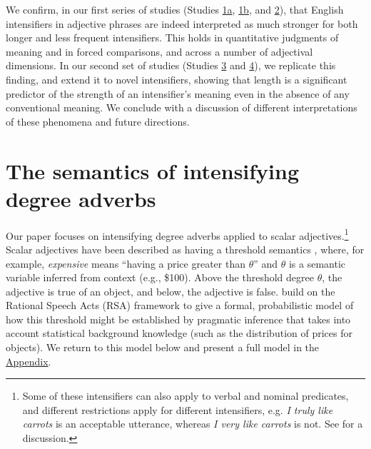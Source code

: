 \documentclass[10pt,letterpaper]{article}
\newcommand{\w}[1]{\emph{#1}}
\begin{document}
We confirm, in our first series of studies (Studies \hyperref[sec:study1a]{1a}, \hyperref[sec:study1b]{1b}, and \hyperref[sec:study2]{2}), that English intensifiers in adjective phrases are indeed interpreted as much stronger for both longer and less frequent intensifiers.
This holds in quantitative judgments of meaning and in forced comparisons, and across a number of adjectival dimensions.
In our second set of studies (Studies \hyperref[sec:study3]{3} and \hyperref[sec:study4]{4}), we replicate this finding, and extend it to novel intensifiers, showing that length is a significant predictor of the strength of an intensifier’s meaning even in the absence of any conventional meaning.
We conclude with a discussion of different interpretations of these phenomena and future directions.

\section{The semantics of intensifying degree adverbs \label{sec:semantics}}

Our paper focuses on intensifying degree adverbs applied to scalar adjectives.\footnote{
  Some of these intensifiers can also apply to verbal and nominal predicates, and different restrictions apply for different intensifiers, e.g. \w{I truly like carrots} is an acceptable utterance, whereas \w{I very like carrots} is not. See  for a discussion.
 }
Scalar adjectives have been described as having a threshold semantics \cite{kennedy_vagueness_2007}, where, for example, \w{expensive} means ``having a price greater than $\theta$'' and $\theta$ is a semantic variable inferred from context (e.g., \$100).
Above the threshold degree $\theta$, the adjective is true of an object, and below, the adjective is false.
 build on the Rational Speech Acts (RSA) framework \cite{frank_predicting_2012, goodman_knowledge_2013} to give a formal, probabilistic model of how this threshold might be established by pragmatic inference that takes into account statistical background knowledge (such as the distribution of prices for objects).
We return to this model below and present a full model in the \hyperref[app:model]{Appendix}.
\end{document}
